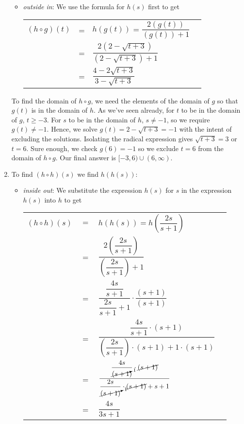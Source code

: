 \begin{ex}
\begin{enumerate}
\begin{itemize}
\item  \textit{outside in}:  We use the formula for $h(s)$ first to get
\begin{longtable}{rclr} $(h \circ g)(t)$ & = & $h(g(t))$ = $\dfrac{2 \left(g(t)\right)}{\left( g(t)\right) + 1}$ & \\ [12pt]
 & = & $\dfrac{2 \left(2-\sqrt{t+3} \right)}{\left(2-\sqrt{t+3}\right)+1}$ & \\[12pt] 
 & = & $\dfrac{4-2\sqrt{t+3}}{3-\sqrt{t+3}}$ & \\
  \end{longtable}
 
 \end{itemize}

To find the domain of $h \circ g$, we need the elements of the domain of $g$ so that $g(t)$ is in the domain of $h$.  As we've seen already, for $t$ to be in the domain of $g$, $t \geq -3$. For $s$ to be in the domain of $h$, $s \neq -1$, so we require $g(t) \neq -1$.  Hence, we solve $g(t) = 2-\sqrt{t+3} = -1$ with the intent of excluding the solutions. Isolating the radical expression gives $\sqrt{t+3} = 3$ or $t = 6$.  Sure enough, we check $g(6)=-1$ so we exclude $t=6$ from the domain of $h \circ g$.  Our final answer is $[-3, 6) \cup (6, \infty)$.


\item  To find $(h \circ h)(s)$ we find $h(h(s))$:

\begin{itemize}

\item  \textit{inside out}: We substitute the expression $h(s)$ for $s$ in the expression $h(s)$ into $h$ to get
\begin{longtable}{rclr} $(h \circ h)(s)$ & $=$ & $h(h(s)) =h\left(\dfrac{2s}{s+1}\right)$ & \\ [15pt]
&=& $\dfrac{2\left(\dfrac{2s}{s+1}\right)}{\left(\dfrac{2s}{s+1}\right)+1}$ & \\ [25pt]
 & = & $\dfrac{\dfrac{4s}{s+1}}{\dfrac{2s}{s+1}+1} \cdot \dfrac{(s+1)}{(s+1)}$ & \\ [25pt]
& = & $\dfrac{\dfrac{4s}{s+1} \cdot (s+1)}{\left(\dfrac{2s}{s+1}\right)\cdot(s+1)+1\cdot(s+1)}$ & \\ [25pt]
& = & $\dfrac{\dfrac{4s}{\cancelto{1}{(s+1})} \cdot \cancel{(s+1)}}{\dfrac{2s}{\cancelto{1}{(s+1)}}\cdot\cancel{(s+1)}+s+1}$ & \\ [25pt]
& = & $\dfrac{4s}{3s+1}$ & \\ 
 \end{longtable}


\end{itemize}
\end{enumerate}
\end{ex}
